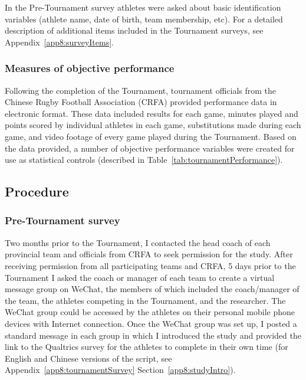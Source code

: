 \begin{CJK}{UTF8}{gbsn}
In the Pre-Tournament survey athletes were asked about basic identification variables (athlete name, date of birth, team membership, etc).  For a detailed description of additional items included in the Tournament surveys, see Appendix~\ref{app8:surveyItems}.



\subsubsection{Measures of objective performance\label{app8:objectivePerformance}}
Following the completion of the Tournament, tournament officials from the Chinese Rugby Football Association (CRFA) provided performance data in electronic format. These data included results for each game, minutes played and points scored by individual athletes in each game, substitutions made during each game, and video footage of every game played during the Tournament.  Based on the data provided, a number of objective performance variables were created for use as statistical controls (described in Table~\ref{tab:tournamentPerformance}).












\subsection{Procedure}

\subsubsection{Pre-Tournament survey}
Two months prior to the Tournament, I contacted the head coach of each provincial team and officials from CRFA to seek permission for the study.  After receiving permission from all participating teams and CRFA, 5 days prior to the Tournament I asked the coach or manager of each team to create a virtual message group on WeChat, the members of which included the coach/manager of the team, the athletes competing in the Tournament, and the researcher.  The WeChat group could be accessed by the athletes on their personal mobile phone devices with Internet connection.  Once the WeChat group was set up, I posted a standard message in each group in which I introduced the study and provided the link to the Qualtrics survey for the athletes to complete in their own time (for English and Chinese versions of the script, see Appendix~\ref{app8:tournamentSurvey} Section~\ref{app8:studyIntro}).


\end{CJK}
